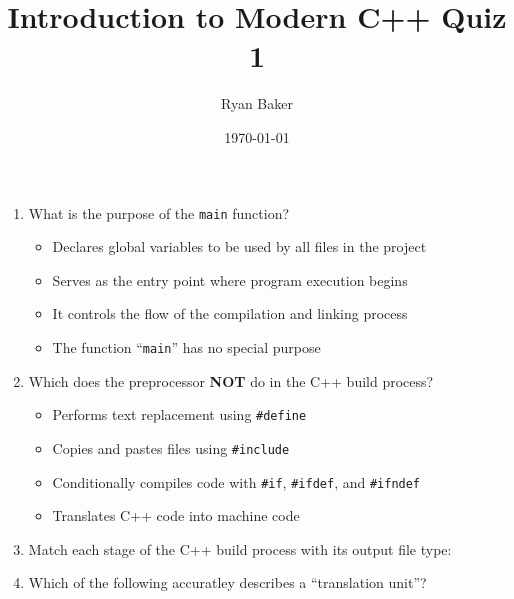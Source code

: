 \documentclass{article}
\title{Introduction to Modern C++ Quiz 1}
\author{Ryan Baker}
\date{\today}
\begin{document}
\maketitle

\begin{enumerate}
	\item What is the purpose of the \texttt{main} function?
	\begin{itemize}
		\item[a)] Declares global variables to be used by all files in the project
		\item[b)] \textcolor{BrickRed}{Serves as the entry point where program execution begins}
		\item[c)] It controls the flow of the compilation and linking process
		\item[d)] The function ``\texttt{main}'' has no special purpose
	\end{itemize}
	\vspace{1em}
	\item Which does the preprocessor \textbf{NOT} do in the C++ build process?
	\begin{itemize}
		\item[a)] Performs text replacement using \textcolor{BurntOrange}{\texttt{\#define}}
		\item[b)] Copies and pastes files using \textcolor{BurntOrange}{\texttt{\#include}}
		\item[c)] Conditionally compiles code with \textcolor{BurntOrange}{\texttt{\#if}}, \textcolor{BurntOrange}{\texttt{\#ifdef}}, and \textcolor{BurntOrange}{\texttt{\#ifndef}}
		\item[d)] \textcolor{BrickRed}{Translates C++ code into machine code}
	\end{itemize}
	\vspace{1em}
	\item Match each stage of the C++ build process with its output file type:
	\begin{center}{}\end{center}
	\item Which of the following accuratley describes a ``translation unit''?

\end{enumerate}
\end{document}
